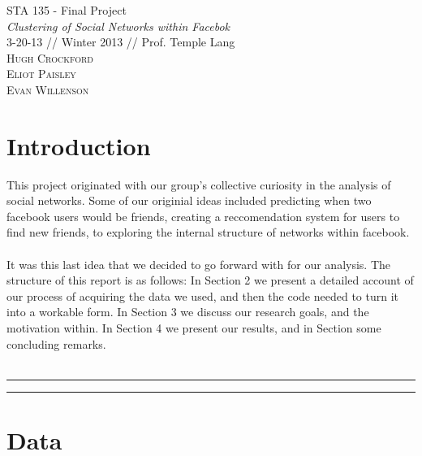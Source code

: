 \documentclass[fleqn]{article}
\begin{document}
\begin{center}
\vspace*{3.0in}
\LARGE STA 135 - Final Project \\ 
\Large \emph{Clustering of Social Networks within Facebok} \\ 
\vspace{0.25in}
\normalsize 3-20-13 // Winter 2013 // Prof. Temple Lang \\ 
\vspace{0.5in}
\textsc{Hugh Crockford\\ Eliot Paisley \\ Evan Willenson}
\end{center}
\newpage 
\section{Introduction}
\noindent This project originated with our group's collective curiosity in the analysis of social networks. Some of our originial ideas included predicting when two facebook users would be friends, creating a reccomendation system for users to find new friends, to exploring the internal structure of networks within facebook. \\ \\
It was this last idea that we decided to go forward with for our analysis. The structure of this report is as follows: In Section 2 we present a detailed account of our process of acquiring the data we used, and then the code needed to turn it into a workable form. In Section 3 we discuss our research goals, and the motivation within. In Section 4 we present our results, and in Section some concluding remarks. \\ \\
\hrule \hrule 

\section{Data}
\end{document}
